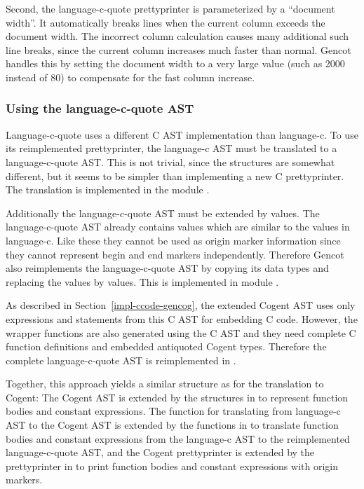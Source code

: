 Second, the language-c-quote prettyprinter is parameterized by a ``document width''. It automatically breaks lines 
when the current column exceeds the document width. The incorrect column calculation causes many additional such
line breaks, since the current column increases much faster than normal. Gencot handles this by setting the document
width to a very large value (such as 2000 instead of 80) to compensate for the fast column increase.

\subsubsection{Using the language-c-quote AST}

Language-c-quote uses a different C AST implementation than language-c. To use its reimplemented prettyprinter, the 
language-c AST must be translated to a language-c-quote AST. This is not trivial, since the structures are somewhat
different, but it seems to be simpler than implementing a new C prettyprinter. The translation is implemented in
the module . 

Additionally the language-c-quote AST must be extended by  values. The language-c-quote AST already 
contains  values which are similar to the  values in language-c. Like these they cannot
be used as origin marker information since they cannot represent begin and end markers independently. Therefore
Gencot also reimplements the language-c-quote AST by copying its data types and replacing the 
values by  values. This is implemented in module .

As described in Section~\ref{impl-ccode-gencog}, the extended Cogent AST uses only expressions and statements from
this C AST for embedding C code. However, the wrapper functions are also generated using the C AST and they 
need complete C function definitions and embedded antiquoted Cogent types. Therefore the complete 
language-c-quote AST is reimplemented in .

Together, this approach yields a similar structure as for the translation to Cogent: The Cogent AST is extended 
by the structures in  to represent function bodies and constant expressions. The function for
translating from language-c AST to the Cogent AST is extended by the functions in  to
translate function bodies and constant expressions from the language-c AST to the reimplemented language-c-quote 
AST, and the Cogent prettyprinter is extended by the prettyprinter
in  to print function bodies and constant expressions with origin markers.

